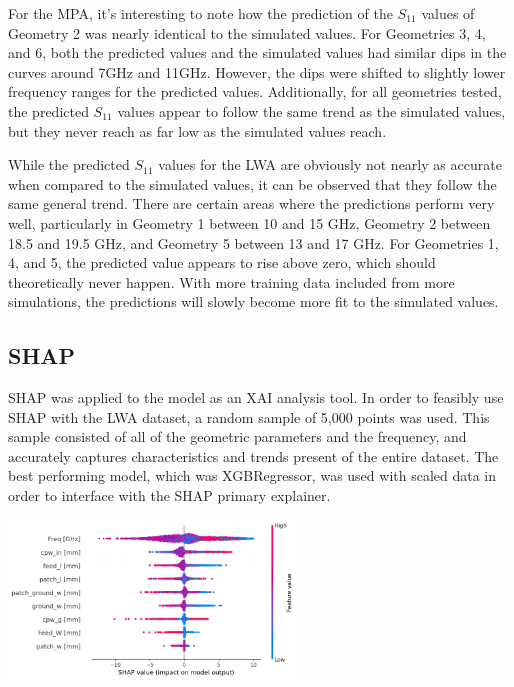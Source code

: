 \documentclass[conference]{IEEEtran}
\newenvironment{Figure}
    {\par\medskip\noindent\minipage{\linewidth}}
    {\endminipage\par\medskip}
\begin{document}
For the MPA, it's interesting to note how the prediction of the $S_{11}$ values of Geometry 2 was nearly identical to the simulated values. For Geometries 3, 4, and 6, both the predicted values and the simulated values had similar dips in the curves around 7GHz and 11GHz. However, the dips were shifted to slightly lower frequency ranges for the predicted values. Additionally, for all geometries tested, the predicted $S_{11}$ values appear to follow the same trend as the simulated values, but they never reach as far low as the simulated values reach. 

While the predicted $S_{11}$ values for the LWA are obviously not nearly as accurate when compared to the simulated values, it can be observed that they follow the same general trend. There are certain areas where the predictions perform very well, particularly in Geometry 1 between 10 and 15 GHz, Geometry 2 between 18.5 and 19.5 GHz, and Geometry 5 between 13 and 17 GHz. For Geometries 1, 4, and 5, the predicted value appears to rise above zero, which should theoretically never happen. With more training data included from more simulations, the predictions will slowly become more fit to the simulated values. 


\subsection{SHAP}
\label{sec:xai}
SHAP was applied to the model as an XAI analysis tool. In order to feasibly use SHAP with the LWA dataset, a random sample of 5,000 points was used. This sample consisted of all of the geometric parameters and the frequency, and accurately captures characteristics and trends present of the entire dataset. The best performing model, which was XGBRegressor, was used with scaled data in order to interface with the SHAP primary explainer. 

    
\begin{Figure}
\centering
\includegraphics[width=3in]{shap_beeswarm}
\label{shap_beeswarm}
\end{Figure}
\end{document}
